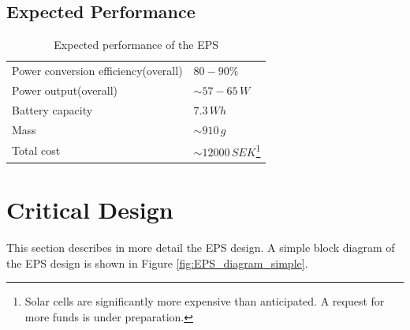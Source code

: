\subsection{Expected Performance}
%
\begin{table}[H]
\centering
\caption{Expected performance of the \ac{EPS}}
\label{tab:expected_performance}
\begin{minipage}{\textwidth}
\begin{tabular}{p{}p{}}
\hline
Power conversion efficiency(overall) & $80-90\%$\\
Power output(overall) & $\sim 57-65\,W$\\
Battery capacity & $7.3\,Wh$\\
Mass & $\sim910\,g$\\
Total cost & $\sim12000\,SEK$\footnote{Solar cells are significantly more expensive than anticipated. A request for more funds is under preparation.}\\
\hline
\end{tabular}\par
\vspace{-0.75\skip\footins}
\renewcommand{\footnoterule}{}
\end{minipage}
\end{table}

\section{Critical Design}
\label{sec:critical_design}

This section describes in more detail the \ac{EPS} design. A simple block diagram of the \ac{EPS} design is shown in Figure \ref{fig:EPS_diagram_simple}.

